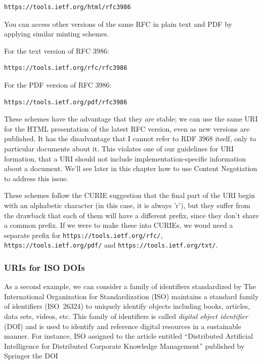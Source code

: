 \begin{lstlisting}
https://tools.ietf.org/html/rfc3986
\end{lstlisting}


You can access other versions of the same RFC in plain text and PDF by applying
similar  minting schemes.

For the text version of RFC 3986:
\begin{lstlisting}
https://tools.ietf.org/rfc/rfc3986
\end{lstlisting}

For the PDF version of RFC 3986:
\begin{lstlisting}
https://tools.ietf.org/pdf/rfc3986
\end{lstlisting}

These schemes have the advantage that they are stable; we can use the same URI
for the HTML presentation of the latest RFC version, even as new versions are published.  It has the disadvantage that I cannot refer to RDF 3968 itself, only to particular documents about it.  This violates one of our guidelines for URI formation, that a URI should not include implementation-specific information about a document. We'll see later in this chapter how to use Content Negotiation to address this issue. 

These schemes follow the CURIE suggestion that the final part of the URI begin with an alphabetic character (in this case, it is always 'r'), but they suffer from the drawback that each of them will have a different prefix, since they don't share a common prefix.  If we were to make these into CURIEs, we woud need a separate prefix for \texttt{https://tools.ietf.org/rfc/}, \texttt{https://tools.ietf.org/pdf/} and  \texttt{https://tools.ietf.org/txt/}. 

\subsubsection{URIs for ISO DOIs}


As a second example, we can consider a family of identifiers
standardized by 
The International Organization for Standardization (ISO) maintains a standard family 
of identifiers (ISO~26324) to uniquely identify objects including books, articles, data sets,
videos, etc. This family of identifiers is called \emph{digital object
identifier} (DOI) and is used to identify and reference digital
resources in a sustainable manner. For instance, ISO assigned to the article entitled
``Distributed Artificial Intelligence for Distributed Corporate
Knowledge Management'' published by Springer the DOI

